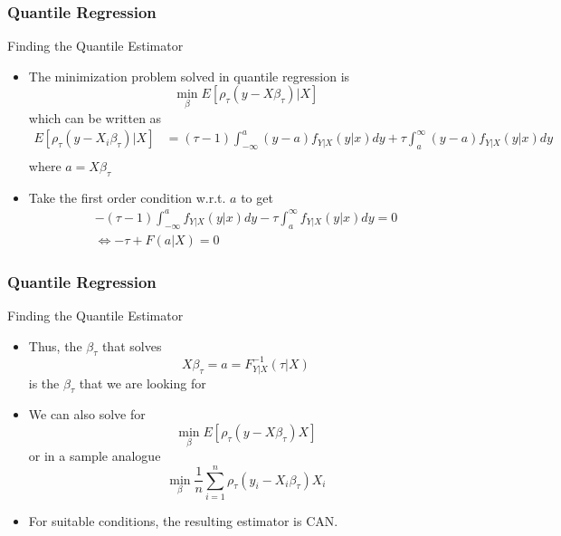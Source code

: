 \documentclass{beamer}
\begin{document}
\begin{frame}
\frametitle{Quantile Regression}
Finding the Quantile Estimator
\begin{itemize}
\item The minimization problem solved in quantile regression is
\[
\min_\beta E[ \rho_\tau(y-X\beta_\tau)|X]
\]
which can be written as
\footnotesize{\begin{align*}
E[ \rho_\tau(y-X_i\beta_\tau)|X] &= (\tau-1)\int_{-\infty}^{a} (y-a)f_{Y|X}(y|x)dy+ \tau\int_{a}^\infty(y-a) f_{Y|X}(y|x)dy\\
\end{align*}}\normalsize
where $a=X\beta_\tau$
\item Take the first order condition w.r.t. $a$ to get
\begin{gather*}
-(\tau-1)\int_{-\infty}^a f_{Y|X}(y|x)dy - \tau\int_a^\infty f_{Y|X}(y|x)dy=0\\
\iff -\tau + F(a|X)=0
\end{gather*}
\end{itemize}
\end{frame}

\begin{frame}
\frametitle{Quantile Regression}
Finding the Quantile Estimator
\begin{itemize}
\item Thus, the $\beta_\tau$ that solves
\[
X\beta_\tau=a=F^{-1}_{Y|X}(\tau|X)
\]
is the $\beta_\tau$ that we are looking for
\item We can also solve for
\[
\min_\beta E[\rho_\tau(y-X\beta_\tau)X]
\] 
or in a sample analogue
\[
\min_\beta \frac{1}{n}\sum_{i=1}^n \rho_\tau(y_i-X_i\beta_\tau)X_i
\]
\item For suitable conditions, the resulting estimator is CAN.
\end{itemize}
\end{frame}
\end{document}

